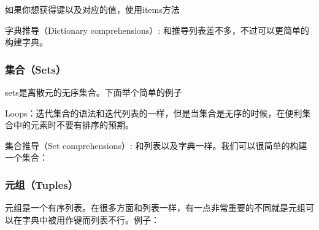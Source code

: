 \documentclass[10pt,a4paper]{article}
\begin{document}

如果你想获得键以及对应的值，使用items方法



字典推导（Dictionary comprehensions）: 和推导列表差不多，不过可以更简单的构建字典。



\subsubsection{集合（Sets）}


sets是离散元的无序集合。下面举个简单的例子




Loops：迭代集合的语法和迭代列表的一样，但是当集合是无序的时候，在便利集合中的元素时不要有排序的预期。



集合推导（Set comprehensions）: 和列表以及字典一样。我们可以很简单的构建一个集合：


\subsubsection{元组（Tuples）}


元组是一个有序列表。在很多方面和列表一样，有一点非常重要的不同就是元组可以在字典中被用作键而列表不行。例子：

\end{document}
